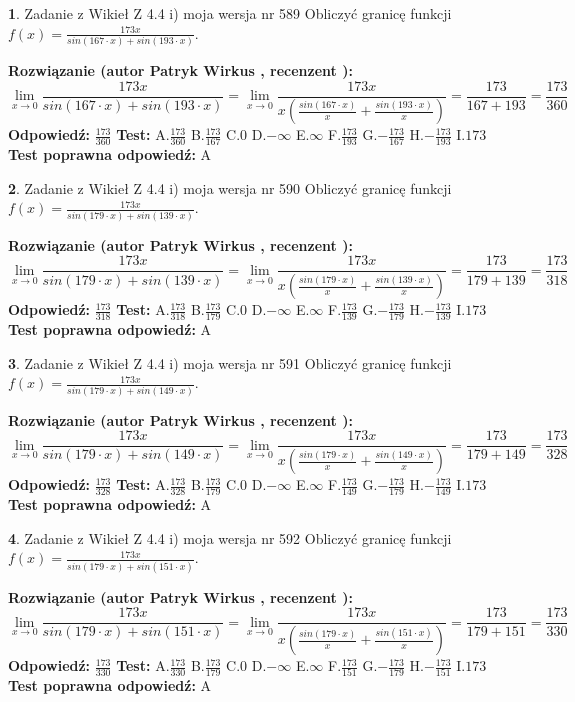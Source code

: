 \documentclass[12pt, a4paper]{article}
\theoremstyle{definition} %
\newtheorem{zad}{}
\newcommand{\zadStart}[1]{\begin{zad}#1\newline}
\newcommand{\zadStop}{\end{zad}}
\newcommand{\rozwStart}[2]{\noindent \textbf{Rozwiązanie (autor #1 , recenzent #2): }\newline}
\newcommand{\rozwStop}{\newline}
\newcommand{\odpStart}{\noindent \textbf{Odpowiedź:}\newline}
\newcommand{\odpStop}{\newline}
\newcommand{\testStart}{\noindent \textbf{Test:}\newline}
\newcommand{\testStop}{\newline}
\newcommand{\kluczStart}{\noindent \textbf{Test poprawna odpowiedź:}\newline}
\newcommand{\kluczStop}{\newline}
\begin{document}
\zadStart{Zadanie z Wikieł Z 4.4 i) moja wersja nr 589}
Obliczyć granicę funkcji $f(x)=\frac{173x}{sin(167\cdot x) +sin(193\cdot x)}$.
\zadStop
\rozwStart{Patryk Wirkus}{}
$$\lim\limits_{x\to 0}\frac{173x}{sin(167\cdot x) +sin(193\cdot x)}=\lim\limits_{x\to 0}\frac{173x}{x(\frac{sin(167\cdot x)}{x}+\frac{sin(193\cdot x)}{x})}=\frac{173}{167+193} = \frac{173}{360}$$
\rozwStop
\odpStart
$\frac{173}{360}$
\odpStop
\testStart
A.$\frac{173}{360}$
B.$\frac{173}{167}$
C.$0$
D.$-\infty$
E.$\infty$
F.$\frac{173}{193}$
G.$-\frac{173}{167}$
H.$-\frac{173}{193}$
I.$173$
\testStop
\kluczStart
A
\kluczStop



\zadStart{Zadanie z Wikieł Z 4.4 i) moja wersja nr 590}
Obliczyć granicę funkcji $f(x)=\frac{173x}{sin(179\cdot x) +sin(139\cdot x)}$.
\zadStop
\rozwStart{Patryk Wirkus}{}
$$\lim\limits_{x\to 0}\frac{173x}{sin(179\cdot x) +sin(139\cdot x)}=\lim\limits_{x\to 0}\frac{173x}{x(\frac{sin(179\cdot x)}{x}+\frac{sin(139\cdot x)}{x})}=\frac{173}{179+139} = \frac{173}{318}$$
\rozwStop
\odpStart
$\frac{173}{318}$
\odpStop
\testStart
A.$\frac{173}{318}$
B.$\frac{173}{179}$
C.$0$
D.$-\infty$
E.$\infty$
F.$\frac{173}{139}$
G.$-\frac{173}{179}$
H.$-\frac{173}{139}$
I.$173$
\testStop
\kluczStart
A
\kluczStop



\zadStart{Zadanie z Wikieł Z 4.4 i) moja wersja nr 591}
Obliczyć granicę funkcji $f(x)=\frac{173x}{sin(179\cdot x) +sin(149\cdot x)}$.
\zadStop
\rozwStart{Patryk Wirkus}{}
$$\lim\limits_{x\to 0}\frac{173x}{sin(179\cdot x) +sin(149\cdot x)}=\lim\limits_{x\to 0}\frac{173x}{x(\frac{sin(179\cdot x)}{x}+\frac{sin(149\cdot x)}{x})}=\frac{173}{179+149} = \frac{173}{328}$$
\rozwStop
\odpStart
$\frac{173}{328}$
\odpStop
\testStart
A.$\frac{173}{328}$
B.$\frac{173}{179}$
C.$0$
D.$-\infty$
E.$\infty$
F.$\frac{173}{149}$
G.$-\frac{173}{179}$
H.$-\frac{173}{149}$
I.$173$
\testStop
\kluczStart
A
\kluczStop



\zadStart{Zadanie z Wikieł Z 4.4 i) moja wersja nr 592}
Obliczyć granicę funkcji $f(x)=\frac{173x}{sin(179\cdot x) +sin(151\cdot x)}$.
\zadStop
\rozwStart{Patryk Wirkus}{}
$$\lim\limits_{x\to 0}\frac{173x}{sin(179\cdot x) +sin(151\cdot x)}=\lim\limits_{x\to 0}\frac{173x}{x(\frac{sin(179\cdot x)}{x}+\frac{sin(151\cdot x)}{x})}=\frac{173}{179+151} = \frac{173}{330}$$
\rozwStop
\odpStart
$\frac{173}{330}$
\odpStop
\testStart
A.$\frac{173}{330}$
B.$\frac{173}{179}$
C.$0$
D.$-\infty$
E.$\infty$
F.$\frac{173}{151}$
G.$-\frac{173}{179}$
H.$-\frac{173}{151}$
I.$173$
\testStop
\kluczStart
A
\kluczStop
\end{document}
